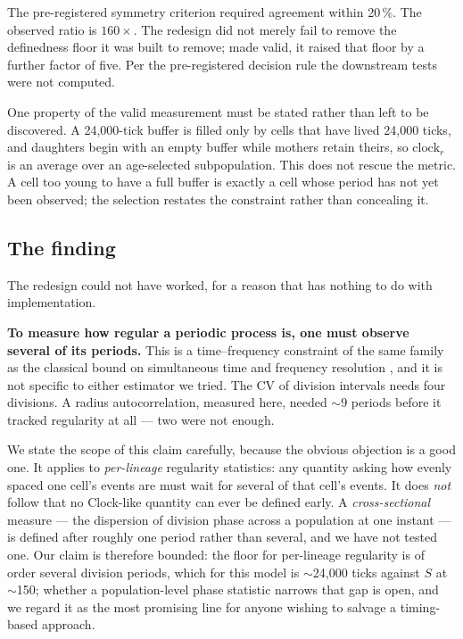 \documentclass[11pt,letterpaper]{article}
\begin{document}
The pre-registered symmetry criterion required agreement within 20\,\%.
The observed ratio is $160\times$. The redesign did not merely fail to
remove the definedness floor it was built to remove; made valid, it
raised that floor by a further factor of five. Per the pre-registered
decision rule the downstream tests were not computed.

One property of the valid measurement must be stated rather than left
to be discovered. A 24{,}000-tick buffer is filled only by cells that
have lived 24{,}000 ticks, and daughters begin with an empty buffer
while mothers retain theirs, so $\mathrm{clock}_r$ is an average over an
age-selected subpopulation. This does not rescue the metric. A cell too
young to have a full buffer is exactly a cell whose period has not yet
been observed; the selection restates the constraint rather than
concealing it.

\subsection{The finding}

The redesign could not have worked, for a reason that has nothing to do
with implementation.

\textbf{To measure how regular a periodic process is, one must observe
several of its periods.} This is a time--frequency constraint of the
same family as the classical bound on simultaneous time and frequency
resolution \citep{gabor1946}, and it
is not specific to either estimator we tried. The CV of division
intervals needs four divisions. A radius autocorrelation, measured
here, needed $\sim$9 periods before it tracked regularity at all ---
two were not enough.

We state the scope of this claim carefully, because the obvious
objection is a good one. It applies to \emph{per-lineage} regularity
statistics: any quantity asking how evenly spaced one cell's events are
must wait for several of that cell's events. It does \emph{not} follow
that no Clock-like quantity can ever be defined early. A
\emph{cross-sectional} measure --- the dispersion of division phase
across a population at one instant --- is defined after roughly one
period rather than several, and we have not tested one. Our claim is
therefore bounded: the floor for per-lineage regularity is of order
several division periods, which for this model is $\sim$24{,}000 ticks
against $S$ at $\sim$150; whether a population-level phase statistic
narrows that gap is open, and we regard it as the most promising line
for anyone wishing to salvage a timing-based approach.
\end{document}
